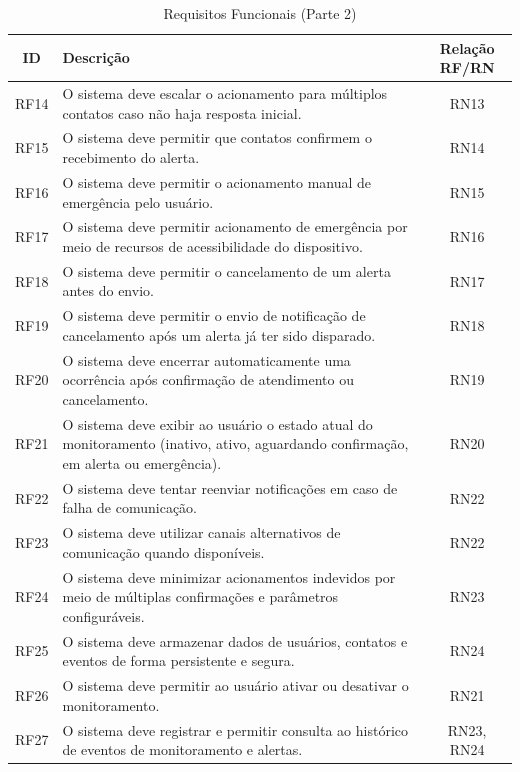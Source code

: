 \begin{table}[H]
\caption{Requisitos Funcionais (Parte 2)}
\label{quad_rf2}
\centering
\begin{tabular}{|c|p{8cm}|c|}
\hline
\textbf{ID} & \textbf{Descrição} & \textbf{Relação RF/RN} \\
\hline
RF14 & O sistema deve escalar o acionamento para múltiplos contatos caso não haja resposta inicial. & RN13 \\
\hline
RF15 & O sistema deve permitir que contatos confirmem o recebimento do alerta. & RN14 \\
\hline
RF16 & O sistema deve permitir o acionamento manual de emergência pelo usuário. & RN15 \\
\hline
RF17 & O sistema deve permitir acionamento de emergência por meio de recursos de acessibilidade do dispositivo. & RN16 \\
\hline
RF18 & O sistema deve permitir o cancelamento de um alerta antes do envio. & RN17 \\
\hline
RF19 & O sistema deve permitir o envio de notificação de cancelamento após um alerta já ter sido disparado. & RN18 \\
\hline
RF20 & O sistema deve encerrar automaticamente uma ocorrência após confirmação de atendimento ou cancelamento. & RN19 \\
\hline
RF21 & O sistema deve exibir ao usuário o estado atual do monitoramento (inativo, ativo, aguardando confirmação, em alerta ou emergência). & RN20 \\
\hline
RF22 & O sistema deve tentar reenviar notificações em caso de falha de comunicação. & RN22 \\
\hline
RF23 & O sistema deve utilizar canais alternativos de comunicação quando disponíveis. & RN22 \\
\hline
RF24 & O sistema deve minimizar acionamentos indevidos por meio de múltiplas confirmações e parâmetros configuráveis. & RN23 \\
\hline
RF25 & O sistema deve armazenar dados de usuários, contatos e eventos de forma persistente e segura. & RN24 \\
\hline
RF26 & O sistema deve permitir ao usuário ativar ou desativar o monitoramento. & RN21 \\
\hline
RF27 & O sistema deve registrar e permitir consulta ao histórico de eventos de monitoramento e alertas. & RN23, RN24 \\
\hline
\end{tabular}

\end{table}

